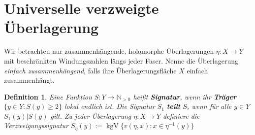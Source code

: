 \documentclass[12pt,a4paper]{article}
\theoremstyle{plain}
\newtheorem{Definition}[Theorem]{Definition}
\newcommand{\herv}[1]{{\emph{\textbf{#1}}}}
\newcommand{\N}{\mathbb{N}}
\numberwithin{equation}{section}
\begin{document}
\section{Universelle verzweigte Überlagerung}
Wir betrachten nur zusammenhängende, holomorphe Überlagerungen $\eta:X\rightarrow Y$ mit beschränkten Windungszahlen längs jeder Faser. Nenne die Überlagerung \emph{einfach zusammenhängend}, falls ihre Überlagerungsfläche $X$ einfach zusammenhängt.
\begin{Definition} Eine Funktion $S:Y\rightarrow \N_{>0}$ heißt \herv{Signatur}, wenn ihr \herv{Träger} $\{y\in Y: S(y) \geq 2 \}$ lokal endlich ist. Die Signatur $S_1$ \herv{teilt} $S$, wenn  für alle $y\in Y$ $S_1(y)|S(y)$ gilt. Zu jeder Überlagerung $\eta:X\rightarrow Y$ definiere die Verzweigungssignatur $S_\eta(y):=\operatorname{kgV}\{v(\eta,x) : x \in \eta^{-1}(y)\}$
\end{Definition}
\end{document}
